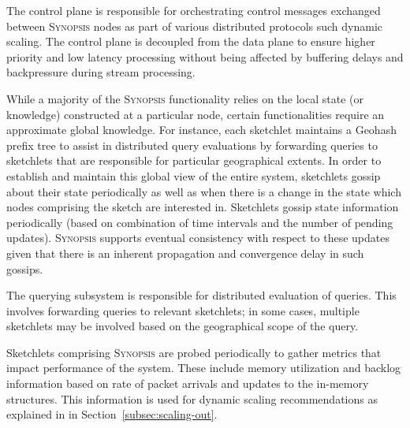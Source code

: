 \begin{description}[leftmargin=*]
	\item[Control plane:] The control plane is responsible for orchestrating control messages exchanged between \textsc{Synopsis} nodes as part of various distributed protocols such dynamic scaling.
    The control plane is decoupled from the data plane to ensure higher priority and low latency processing without being affected by buffering delays and backpressure during stream processing.

	\item[Gossip subsystem:] While a majority of the \textsc{Synopsis} functionality relies on the local state (or knowledge) constructed at a particular node, certain functionalities require an approximate global knowledge.
    For instance, each sketchlet maintains a Geohash prefix tree to assist in distributed query evaluations by forwarding queries to sketchlets that are responsible for particular geographical extents.
    In order to establish and maintain this global view of the entire system, sketchlets gossip about their state periodically as well as when there is a change in the state which nodes comprising the sketch are interested in.
    Sketchlets gossip state information periodically (based on combination of time intervals and the number of pending updates).
    \textsc{Synopsis} supports eventual consistency with respect to these updates given that there is an inherent propagation and convergence delay in such gossips.

	\item[Querying subsystem:] The querying subsystem is responsible for distributed evaluation of queries.
    This involves forwarding queries to relevant sketchlets; in some cases, multiple sketchlets may be involved based on the geographical scope of the query.

    \item[Monitoring subsystem:] Sketchlets comprising \textsc{Synopsis} are probed periodically to gather metrics that impact performance of the system.
    These include memory utilization and backlog information based on rate of packet arrivals and updates to the in-memory structures.
    This information is used for dynamic scaling recommendations as explained in in Section~\ref{subsec:scaling-out}.
\end{description}
